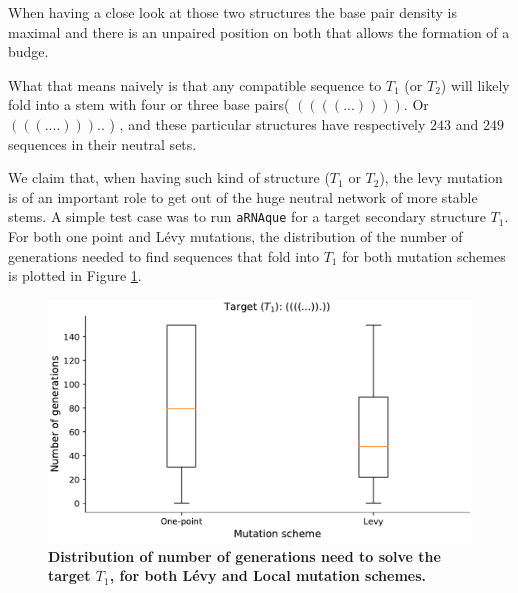 When having a close look at those two structures the base pair density is maximal and there is an unpaired position on both that allows the formation of a budge. 

What that means naively is that any compatible sequence to $T_1$ (or $T_2$) will likely fold into a stem with four or three base pairs( $((((...)))).$ Or $(((....)))..$ ) , and these particular structures have respectively $243$ and $249$ sequences in their neutral sets. 

We claim that, when having such kind of structure ($T_1$ or $T_2$), the levy mutation is of an important role to get out of the huge neutral network of more stable stems. A simple test case was to run \texttt{aRNAque} for a target secondary structure $T_1$.  For both one point and Lévy mutations, the distribution of the number of generations needed to find sequences that fold into $T_1$ for both mutation schemes is plotted in Figure \ref{fig:target1}. 

\begin{figure}[H]
	\includegraphics[width=1.0\linewidth]{../res/images/aRNAque/Target1.pdf}
	\caption{\textbf{Distribution of number of generations need to solve the target $T_1$, for both Lévy and Local mutation schemes.}}
	\label{fig:target1}
\end{figure}


